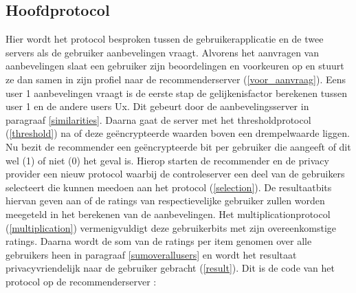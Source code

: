 \subsection{Hoofdprotocol}
Hier wordt het protocol besproken tussen de gebruikerapplicatie en de twee servers als de gebruiker aanbevelingen vraagt. Alvorens het aanvragen van aanbevelingen slaat een gebruiker zijn beoordelingen en voorkeuren op en stuurt ze dan samen in zijn profiel naar de recommenderserver (\ref{voor_aanvraag}). Eens user 1 aanbevelingen vraagt is de eerste stap de gelijkenisfactor berekenen tussen user 1 en de andere users Ux. Dit gebeurt door de aanbevelingsserver in paragraaf \ref{similarities}.  Daarna gaat de server met het thresholdprotocol (\ref{threshold}) na of deze ge\"encrypteerde waarden boven een drempelwaarde liggen. Nu bezit de recommender een ge\"encrypteerde bit per gebruiker die aangeeft of dit wel (1) of niet (0) het geval is. Hierop starten de recommender en de privacy provider een nieuw protocol waarbij de controleserver een deel van de gebruikers selecteert die kunnen meedoen aan het protocol (\ref{selection}). De resultaatbits hiervan geven aan of de ratings van respectievelijke gebruiker zullen worden meegeteld in het berekenen van de aanbevelingen. Het multiplicationprotocol (\ref{multiplication}) vermenigvuldigt deze gebruikerbits met zijn overeenkomstige ratings. Daarna wordt de som van de ratings per item genomen over alle gebruikers heen in paragraaf \ref{sumoverallusers} en wordt het resultaat privacyvriendelijk naar de gebruiker gebracht (\ref{result}). Dit is de code van het protocol op de recommenderserver : 

